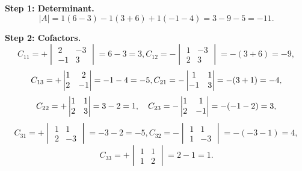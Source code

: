 \documentclass[12pt,a3paper]{article}
\begin{document}
\begin{tcolorbox}[enhanced,breakable,
  colback=cB!4,colframe=cB,boxrule=0.8pt,arc=5pt,
  title={\textbf{Answer --- Inverse of $A=\begin{pmatrix}1&1&1\\1&2&-3\\2&-1&3\end{pmatrix}$
    by Adjoint; Verify $A(\mathrm{adj}\,A)=|A|I_3$}},
  fonttitle=\bfseries\color{white},colbacktitle=cB]

\textbf{Step 1: Determinant.}
\[
  |A| = 1(6-3)-1(3+6)+1(-1-4) = 3-9-5 = -11.
\]

\textbf{Step 2: Cofactors.}
\[
C_{11}=+\begin{vmatrix}2&-3\\-1&3\end{vmatrix}=6-3=3,
C_{12}=-\begin{vmatrix}1&-3\\2&3\end{vmatrix}=-(3+6)=-9,
\]
\[
C_{13}=+\begin{vmatrix}1&2\\2&-1\end{vmatrix}=-1-4=-5,\\
C_{21}=-\begin{vmatrix}1&1\\-1&3\end{vmatrix}=-(3+1)=-4,
\]
\[
C_{22}=+\begin{vmatrix}1&1\\2&3\end{vmatrix}=3-2=1,\quad
C_{23}=-\begin{vmatrix}1&1\\2&-1\end{vmatrix}=-(-1-2)=3,\\[4pt]
\]
\[
C_{31}=+\begin{vmatrix}1&1\\2&-3\end{vmatrix}=-3-2=-5,
C_{32}=-\begin{vmatrix}1&1\\1&-3\end{vmatrix}=-(-3-1)=4,
\]
\[
C_{33}=+\begin{vmatrix}1&1\\1&2\end{vmatrix}=2-1=1.
\]



\end{tcolorbox}
\end{document}

